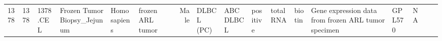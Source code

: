 \documentclass[]{article}
\begin{document}
\begin{longtable}[]{@{}lllllllrllllllllll@{}}
\begin{minipage}[t]{0.02\columnwidth}
1378\strut
\end{minipage} & \begin{minipage}[t]{0.01\columnwidth}\raggedright
1378\strut
\end{minipage} & \begin{minipage}[t]{0.02\columnwidth}\raggedright
1378.CEL\strut
\end{minipage} & \begin{minipage}[t]{0.06\columnwidth}\raggedright
Frozen Tumor Biopsy\_Jejunum\strut
\end{minipage} & \begin{minipage}[t]{0.02\columnwidth}\raggedright
Homo sapiens\strut
\end{minipage} & \begin{minipage}[t]{0.04\columnwidth}\raggedright
frozen ARL tumor\strut
\end{minipage} & \begin{minipage}[t]{0.05\columnwidth}\raggedleft
33\strut
\end{minipage} & \begin{minipage}[t]{0.04\columnwidth}\raggedright
Male\strut
\end{minipage} & \begin{minipage}[t]{0.06\columnwidth}\raggedright
DLBCL (PC)\strut
\end{minipage} & \begin{minipage}[t]{0.06\columnwidth}\raggedright
ABC DLBCL\strut
\end{minipage} & \begin{minipage}[t]{0.04\columnwidth}\raggedright
positive\strut
\end{minipage} & \begin{minipage}[t]{0.02\columnwidth}\raggedright
total RNA\strut
\end{minipage} & \begin{minipage}[t]{0.01\columnwidth}\raggedright
biotin\strut
\end{minipage} & \begin{minipage}[t]{0.08\columnwidth}\raggedright
Gene expression data from frozen ARL tumor specimen\strut
\end{minipage} & \begin{minipage}[t]{0.01\columnwidth}\raggedright
GPL570\strut
\end{minipage} & \begin{minipage}[t]{0.00\columnwidth}\raggedright
NA\strut
\end{minipage} & \begin{minipage}[t]{0.01\columnwidth}\raggedright

\end{minipage}
\end{longtable}
\end{document}
